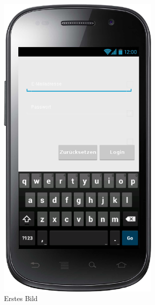 \begin{figure}[htbp] 
  \centering
     \includegraphics[width=0.7\textwidth]{anhang/mockups/login.png}
  \caption{Erstes Bild}
  \label{fig:Bild1}
\end{figure}

